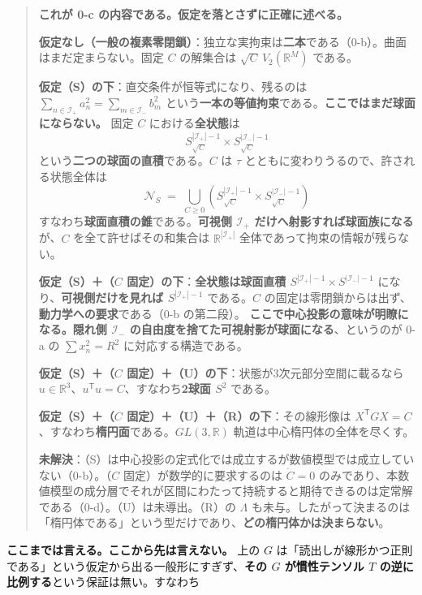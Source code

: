 \documentclass[
  10pt,
]{ltjsarticle}
\begin{document}
\begin{quote}
\textbf{これが 0-c の内容である。仮定を落とさずに正確に述べる。}

\textbf{仮定なし（一般の複素零閉鎖）}：独立な実拘束は\textbf{二本}である（0-b）。曲面はまだ定まらない。固定
\(C\) の解集合は \(\sqrt{C}\,V_2(\mathbb{R}^M)\) である。

\textbf{仮定（S）の下}：直交条件が恒等式になり、残るのは
\(\sum_{n\in \mathcal{I}_+}a_n^2 = \sum_{m\in \mathcal{I}_-}b_m^2\)
という\textbf{一本の等値拘束}である。\textbf{ここではまだ球面にならない。}
固定 \(C\) における\textbf{全状態}は
\[S^{|\mathcal{I}_+|-1}_{\sqrt{C}} \times S^{|\mathcal{I}_-|-1}_{\sqrt{C}}\]
という\textbf{二つの球面の直積}である。\(C\) は \(\tau\)
とともに変わりうるので、許される状態全体は
\[\mathcal{N}_S \;=\; \bigcup_{C \ge 0}\left(S^{|\mathcal{I}_+|-1}_{\sqrt{C}} \times S^{|\mathcal{I}_-|-1}_{\sqrt{C}}\right)\]
すなわち\textbf{球面直積の錐}である。\textbf{可視側 \(\mathcal{I}_+\)
だけへ射影すれば球面族になる}が、\(C\) を全て許せばその和集合は
\(\mathbb{R}^{|\mathcal{I}_+|}\) 全体であって拘束の情報が残らない。

\textbf{仮定（S）＋（\(C\) 固定）の下}：\textbf{全状態は球面直積
\(S^{|\mathcal{I}_+|-1}\times S^{|\mathcal{I}_-|-1}\)}
になり、\textbf{可視側だけを見れば \(S^{|\mathcal{I}_+|-1}\)}
である。\(C\)
の固定は零閉鎖からは出ず、\textbf{動力学への要求}である（0-b
の第二段）。 \textbf{ここで中心投影の意味が明瞭になる。隠れ側
\(\mathcal{I}_-\) の自由度を捨てた可視射影が球面になる}、というのが 0-a
の \(\sum x_n^2 = R^2\) に対応する構造である。

\textbf{仮定（S）＋（\(C\)
固定）＋（U）の下}：状態が3次元部分空間に載るなら
\(u \in \mathbb{R}^3\)、\(u^{\mathsf T}u = C\)、すなわち\textbf{2球面
\(S^2\)} である。

\textbf{仮定（S）＋（\(C\) 固定）＋（U）＋（R）の下}：その線形像は
\(X^{\mathsf T}GX = C\)、すなわち\textbf{楕円面}である。\(GL(3,\mathbb{R})\)
軌道は中心楕円体の全体を尽くす。

\textbf{未解決}：（S）は中心投影の定式化では成立するが数値模型では成立していない（0-b）。（\(C\)
固定）が数学的に要求するのは \(\dot C=0\)
のみであり、本数値模型の成分層でそれが区間にわたって持続すると期待できるのは定常解である（0-d）。（U）は未導出。（R）の
\(\Lambda\)
も未与。したがって決まるのは「楕円体である」という型だけであり、\textbf{どの楕円体かは決まらない}。
\end{quote}

\textbf{ここまでは言える。ここから先は言えない。} 上の \(G\)
は「読出しが線形かつ正則である」という仮定から出る一般形にすぎず、\textbf{その
\(G\) が慣性テンソル \(T\) の逆に比例する}という保証は無い。すなわち
\end{document}
